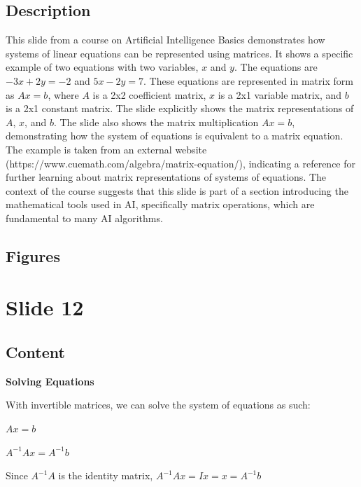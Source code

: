 \documentclass{article}%
\begin{document}
\subsection{Description}%
This slide from a course on Artificial Intelligence Basics demonstrates how systems of linear equations can be represented using matrices.  It shows a specific example of two equations with two variables, $x$ and $y$.  The equations are $-3x + 2y = -2$ and $5x - 2y = 7$.  These equations are represented in matrix form as $Ax = b$, where $A$ is a 2x2 coefficient matrix, $x$ is a 2x1 variable matrix, and $b$ is a 2x1 constant matrix.  The slide explicitly shows the matrix representations of $A$, $x$, and $b$.  The slide also shows the matrix multiplication $Ax = b$, demonstrating how the system of equations is equivalent to a matrix equation.  The example is taken from an external website (https://www.cuemath.com/algebra/matrix-equation/), indicating a reference for further learning about matrix representations of systems of equations. The context of the course suggests that this slide is part of a section introducing the mathematical tools used in AI, specifically matrix operations, which are fundamental to many AI algorithms.%
\subsection{Figures}%
\begin{figure}[H]%
\centering%
\end{figure}

%
\newpage%
\section{Slide 12}%
\label{sec:Slide12}%
\subsection{Content}%

\textbf{Solving Equations}

With invertible matrices, we can solve the system of equations as such:

$Ax = b$

$A^{-1}Ax = A^{-1}b$

Since $A^{-1}A$ is the identity matrix, $A^{-1}Ax = Ix = x = A^{-1}b$
%
\end{document}
